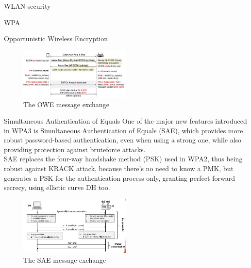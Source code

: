 \begin{section}{WLAN security}
\begin{subsection}{WPA}
\begin{subsubsection}{Opportunistic Wireless Encryption}
      \begin{figure}[h]
        \centering
        \includegraphics[width=0.5\textwidth]{img/wireless/owe.png}
        \caption{The OWE message exchange}
      \end{figure}

    \end{subsubsection}
    \begin{subsubsection}{Simultaneous Authentication of Equals}
      One of the major new features introduced in WPA3 is Simultaneous Authentication of Equals (SAE),
      which provides more robust password-based authentication, even when using a strong one, while 
      also providing protection against bruteforce attacks.\\
      SAE replaces the four-way handshake method (PSK) used in WPA2, thus being robust against 
      KRACK attack, because there's no need to know a PMK, but generates a PSK for the authentication
      process only, granting perfect forward secrecy, using ellictic curve DH too.\\
      \begin{figure}[h]
        \centering
        \includegraphics[width=0.5\textwidth]{img/wireless/sae.png}
        \caption{The SAE message exchange}
      \end{figure}


    \end{subsubsection}



  \end{subsection}

\end{section}


